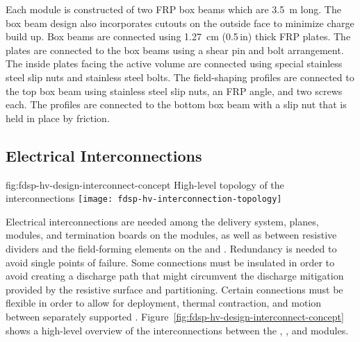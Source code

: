 Each  module is constructed of two FRP box beams which are \SI{3.5}{\m} long. The box beam design also incorporates cutouts on the outside face to minimize charge build up. Box beams are connected using \SI{1.27}{\cm} (\num{0.5}\,in) thick FRP plates. The plates are connected to the box beams using a shear pin and bolt arrangement. The inside plates facing the active volume are connected using special stainless steel slip nuts and stainless steel bolts. The field-shaping profiles are connected to the top box beam using stainless steel slip nuts, an FRP angle, and two screws each. The profiles are connected to the bottom box beam with a slip nut that is held in place by friction.



\subsection{Electrical Interconnections} %
\label{sec:fdsp-hv-design-interconnect}

\begin{dunefigure}{fig:fdsp-hv-design-interconnect-concept}
  {High-level topology of the  interconnections}
  \texttt{[image: fdsp-hv-interconnection-topology]}
\end{dunefigure}

Electrical interconnections are needed among the  delivery system,  planes,  modules, and termination
boards on the  modules, as well as between resistive dividers and
the field-forming elements on the  and .  Redundancy is
needed to avoid single points of failure. 
Some connections must be
insulated in order to avoid creating a discharge path that might
circumvent the discharge mitigation provided by the resistive 
surface and  partitioning.  Certain connections must be
flexible in order to allow for  deployment, thermal
contraction, and motion between separately supported .  Figure~\ref{fig:fdsp-hv-design-interconnect-concept} shows a high-level
overview of the interconnections between the , , and  modules.


